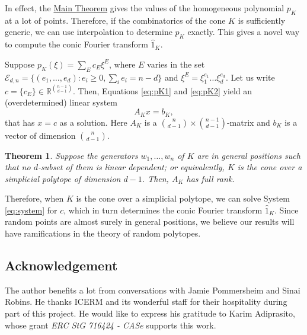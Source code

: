 \documentclass{article}
\newtheorem{thm}{Theorem}
\begin{document}
In effect, the \hyperref[thm:MAIN]{Main Theorem} gives the values of the homogeneous polynomial $p_K$ at a lot of points. Therefore, if the combinatorics of the cone $K$ is sufficiently generic, we can use interpolation to determine $p_K$ exactly. This gives a novel way to compute the conic Fourier transform $\hat{1}_K$.


Suppose $p_K(\xi) = \sum_E c_E \xi^E$, where $E$ varies in the set $\mathcal{E}_{d,n} = \{(e_1, \dots, e_d) : e_i \geq 0, \sum_i e_i = n-d \}$ and $\xi^E = \xi_1^{e_1} \dots \xi_d^{e_d}$. Let us write $c = \{c_E\} \in \mathbb{R}^{\binom{n-1}{d-1}}$. Then, Equations \ref{eq:pK1} and \ref{eq:pK2} yield an (overdetermined) linear system 
\begin{equation}\label{eq:system}
	A_K x = b_K,
\end{equation} 
that has $x = c$ as a solution. Here $A_K$ is a $\binom{n}{d-1} \times \binom{n-1}{d-1}$-matrix and $b_K$ is a vector of dimension $\binom{n}{d-1}$. 

\begin{thm}\label{thm:generic}
	Suppose the generators $w_1, \dots, w_n$ of $K$ are in general positions such that no $d$-subset of them is linear dependent; or equivalently, $K$ is the cone over a simplicial polytope of dimension $d-1$.  Then, $A_K$ has full rank.
\end{thm}

Therefore, when $K$ is the cone over a simplicial polytope, we can solve System \ref{eq:system} for $c$, which in turn determines the conic Fourier transform $\hat{1}_K$. Since random points are almost surely in general positions, we believe our results will have ramifications in the theory of random polytopes.

\subsection*{Acknowledgement}
The author benefits a lot from conversations with Jamie Pommersheim and Sinai Robins. He thanks ICERM and its wonderful staff for their hospitality during part of this project. He would like to express his gratitude to Karim Adiprasito, whose grant \textit{ERC StG 716424 - CASe} supports this work.
\end{document}

